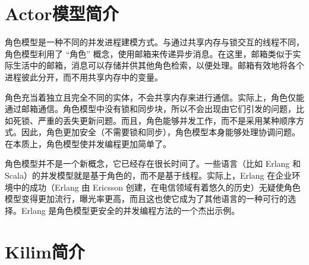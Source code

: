 \section{Actor模型简介}
角色模型是一种不同的并发进程建模方式。与通过共享内存与锁交互的线程不同，角色模型利用了 “角色” 概念，使用邮箱来传递异步消息。在这里，邮箱类似于实际生活中的邮箱，消息可以存储并供其他角色检索，以便处理。邮箱有效地将各个进程彼此分开，而不用共享内存中的变量。

角色充当着独立且完全不同的实体，不会共享内存来进行通信。实际上，角色仅能通过邮箱通信。角色模型中没有锁和同步块，所以不会出现由它们引发的问题，比如死锁、严重的丢失更新问题。而且，角色能够并发工作，而不是采用某种顺序方式。因此，角色更加安全（不需要锁和同步），角色模型本身能够处理协调问题。在本质上，角色模型使并发编程更加简单了。

角色模型并不是一个新概念，它已经存在很长时间了。一些语言（比如 Erlang 和 Scala）的并发模型就是基于角色的，而不是基于线程。实际上，Erlang 在企业环境中的成功（Erlang 由 Ericsson 创建，在电信领域有着悠久的历史）无疑使角色模型变得更加流行，曝光率更高，而且这也使它成为了其他语言的一种可行的选择。Erlang 是角色模型更安全的并发编程方法的一个杰出示例。


\section{Kilim简介}




